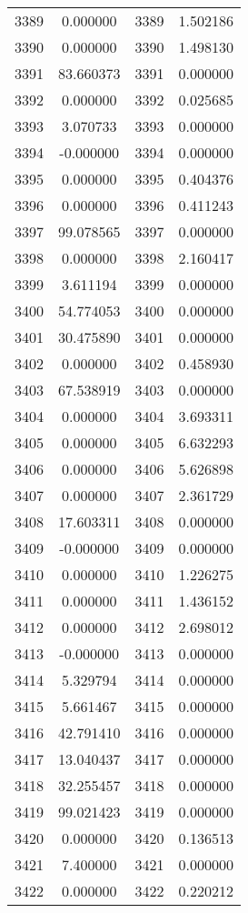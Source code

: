 \documentclass[12pt]{article}
\begin{document}
\begin{longtable}{@{}cccc@{}}
3389 & 0.000000 & 3389 & 1.502186 \\
3390 & 0.000000 & 3390 & 1.498130 \\
3391 & 83.660373 & 3391 & 0.000000 \\
3392 & 0.000000 & 3392 & 0.025685 \\
3393 & 3.070733 & 3393 & 0.000000 \\
3394 & -0.000000 & 3394 & 0.000000 \\
3395 & 0.000000 & 3395 & 0.404376 \\
3396 & 0.000000 & 3396 & 0.411243 \\
3397 & 99.078565 & 3397 & 0.000000 \\
3398 & 0.000000 & 3398 & 2.160417 \\
3399 & 3.611194 & 3399 & 0.000000 \\
3400 & 54.774053 & 3400 & 0.000000 \\
3401 & 30.475890 & 3401 & 0.000000 \\
3402 & 0.000000 & 3402 & 0.458930 \\
3403 & 67.538919 & 3403 & 0.000000 \\
3404 & 0.000000 & 3404 & 3.693311 \\
3405 & 0.000000 & 3405 & 6.632293 \\
3406 & 0.000000 & 3406 & 5.626898 \\
3407 & 0.000000 & 3407 & 2.361729 \\
3408 & 17.603311 & 3408 & 0.000000 \\
3409 & -0.000000 & 3409 & 0.000000 \\
3410 & 0.000000 & 3410 & 1.226275 \\
3411 & 0.000000 & 3411 & 1.436152 \\
3412 & 0.000000 & 3412 & 2.698012 \\
3413 & -0.000000 & 3413 & 0.000000 \\
3414 & 5.329794 & 3414 & 0.000000 \\
3415 & 5.661467 & 3415 & 0.000000 \\
3416 & 42.791410 & 3416 & 0.000000 \\
3417 & 13.040437 & 3417 & 0.000000 \\
3418 & 32.255457 & 3418 & 0.000000 \\
3419 & 99.021423 & 3419 & 0.000000 \\
3420 & 0.000000 & 3420 & 0.136513 \\
3421 & 7.400000 & 3421 & 0.000000 \\
3422 & 0.000000 & 3422 & 0.220212 \\

\end{longtable}
\end{document}
